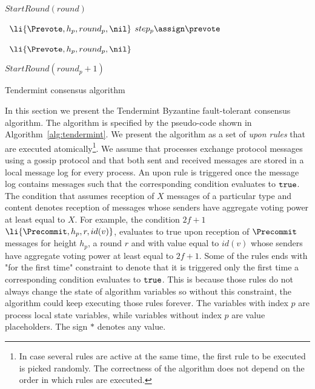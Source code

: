 \begin{algorithm}[htb!]
\begin{algorithmic}[1]
		\SHORTSPACE 
		\label{line:tab:skipRounds} 
			\STATE $StartRound(round)$ \label{line:tab:nextRound2} 
		\ENDUPON
		
		\SHORTSPACE 
		 \label{line:tab:onTimeoutPropose} 
			\STATE \Broadcast \ $\li{\Prevote,h_p,round_p, \nil}$ 
		 	\label{line:tab:prevote-nil-on-timeout}	
		 	\STATE $step_p \assign \prevote$ 
		 \ENDIF	
		 \ENDFUNCTION
		
		\SHORTSPACE 
		 \label{line:tab:onTimeoutPrevote} 
			\STATE \Broadcast \ $\li{\Prevote,h_p,round_p,\nil}$   
			\label{line:tab:precommit-nil-onTimeout}
		\ENDIF	
		\ENDFUNCTION
		
		\SHORTSPACE 
		 \label{line:tab:onTimeoutPrecommit} 
			\STATE $StartRound(round_p + 1)$ \label{line:tab:nextRound} 
		\ENDIF
		\ENDFUNCTION	
	\end{algorithmic} \caption{Tendermint consensus algorithm}
	\label{alg:tendermint} 
\end{algorithm}

In this section we present the Tendermint Byzantine fault-tolerant consensus
algorithm. The algorithm is specified by the pseudo-code shown in
Algorithm~\ref{alg:tendermint}. We present the algorithm as a set of \emph{upon
rules} that are executed atomically\footnote{In case several rules are active
at the same time, the first rule to be executed is picked randomly. The
correctness of the algorithm does not depend on the order in which rules are
executed.}. We assume that processes exchange protocol messages using a gossip
protocol and that both sent and received messages are stored in a local message
log for every process. An upon rule is triggered once the message log contains
messages such that the corresponding condition evaluates to $\tt{true}$. The
condition that assumes reception of $X$ messages of a particular type and
content denotes reception of messages whose senders have aggregate voting power at
least equal to $X$. For example, the condition $2f+1$ $\li{\Precommit,h_p,r,id(v)}$,  
evaluates to true upon reception of $\Precommit$ messages for height $h_p$, 
a round $r$ and with value equal to $id(v)$ whose senders have aggregate voting 
power at least equal to $2f+1$. Some of the rules ends with "for the first time" constraint 
to denote that it is triggered only the first time a corresponding condition evaluates 
to $\tt{true}$. This is because those rules do not always change the state of algorithm 
variables so without this constraint, the algorithm could keep 
executing those rules forever. The variables with index $p$ are process local state
variables, while variables without index $p$ are value placeholders. The sign
$*$ denotes any value.    

